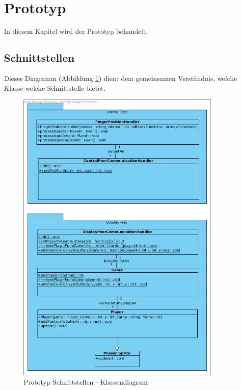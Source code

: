 \FloatBarrier

\section{Prototyp}
In diesem Kapitel wird der Prototyp behandelt.

\subsection{Schnittstellen}
Dieses Diagramm (Abbildung \ref{Prototyp Schnittstellen - Klassendiagram}) dient dem gemeinsamen Verständnis, welche Klasse welche Schnittstelle bietet.
\begin{figure}[ht]
	\centering
	\includegraphics[width=0.9\textwidth]{architecture/PrototypeClassDiagram.png}
	\caption{Prototyp Schnittstellen - Klassendiagram}
	\label{Prototyp Schnittstellen - Klassendiagram}
\end{figure}

